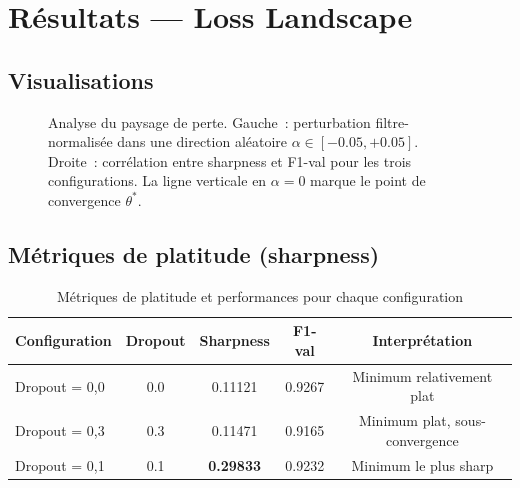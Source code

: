 \documentclass[12pt,a4paper]{article}
\newcommand{\warn}[1]{\textcolor{warnred}{\textbf{#1}}}
\begin{document}
\section{Résultats — Loss Landscape}
\label{sec:loss_landscape}

\subsection{Visualisations}
\label{ssec:landscape_viz}

\begin{figure}[H]
  \centering
  \caption{Analyse du paysage de perte. Gauche~: perturbation filtre-normalisée
    dans une direction aléatoire $\alpha \in [-0.05, +0.05]$. Droite~: corrélation
    entre sharpness et F1-val pour les trois configurations.
    La ligne verticale en $\alpha=0$ marque le point de convergence $\theta^*$.}
  \label{fig:loss_landscape}
\end{figure}

\subsection{Métriques de platitude (sharpness)}
\label{ssec:sharpness}

\begin{table}[H]
  \centering
  \caption{Métriques de platitude et performances pour chaque configuration}
  \label{tab:sharpness}
  \begin{tabular}{lcccc}
    \toprule
    \textbf{Configuration} & \textbf{Dropout} & \textbf{Sharpness}
    & \textbf{F1-val} & \textbf{Interprétation} \\
    \midrule
    Dropout = 0,0 & 0.0 & 0.11121 & 0.9267 & Minimum relativement plat \\
    Dropout = 0,3 & 0.3 & 0.11471 & 0.9165 & Minimum plat, sous-convergence \\
    Dropout = 0,1 & 0.1 & \warn{0.29833} & 0.9232 & Minimum le plus sharp \\
    \bottomrule
  \end{tabular}
\end{table}
\end{document}
